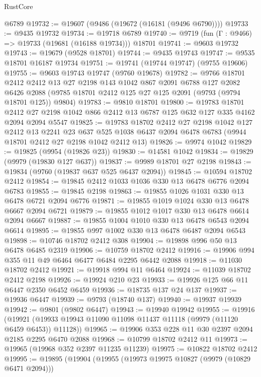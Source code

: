 \begin{lexlean}{RustCore}
\begin{coremodule}
    @6789
@19732 := @19607 (@9486 (@19672 (@16181 (@9496 @6790))))
@19733 := @9435 @19732
@19734 := @19718 @6789
@19740 := @9719 (fun (Γ : @9466) => @19733 (@19681 (@16188 @19734))) @18701
@19741 := @9603 @19732
@19743 := @19679 (@9528 @18701)
@19744 := @9435 @19743
@19747 := @9535 @18701 @16187 @19734
@19751 := @19741 (@19744 @19747) (@9755 @19606)
@19755 := @9603 @19743 @19747 (@9760 @19678)
@19782 := @9766
    @18701
    @2412
    @2412
    @13
    @27
    @2198
    @143
    @1042
    @867
    @2091
    @6788
    @127
    @2082
    @6426
    @2088
    (@9785 @18701 @2412 @125 @27 @125 @2091 (@9793 (@9794 @18701 @125)) @9804)
@19783 := @9810 @18701
@19800 := @19783
    @18701
    @2412
    @27
    @2198
    @1042
    @866
    @2412
    @13
    @6787
    @125
    @632
    @127
    @335
    @4162
    @2094
    @2094
    @5547
@19825 := @19783
    @18702
    @2412
    @27
    @2198
    @1042
    @127
    @2412
    @13
    @2241
    @23
    @637
    @525
    @1038
    @6437
    @2094
    @6478
    @6783
    (@9944 @18701 @2412 @27 @2198 @1042 @2412 @13)
@19826 := @9974 @1042
@19829 := @19825 (@9954 (@19826 @23))
@19830 := @14581 @1042
@19834 := @19829 (@9979 (@19830 @127 @637))
@19837 := @9989 @18701 @27 @2198
@19843 := @19834 (@9760 (@19837 @637 @525 @6437 @2094))
@19845 := @10594 @18702 @2412
@19854 := @19845 @2412 @1033 @1036 @330 @13 @6478 @6776 @2094 @6783
@19855 := @19845 @2198
@19863 := @19855 @1026 @1031 @330 @13 @6478 @6721 @2094 @6776
@19871 := @19855 @1019 @1024 @330 @13 @6478 @6667 @2094 @6721
@19879 := @19855 @1012 @1017 @330 @13 @6478 @6614 @2094 @6667
@19887 := @19855 @1004 @1010 @330 @13 @6478 @6543 @2094 @6614
@19895 := @19855 @997 @1002 @330 @13 @6478 @6487 @2094 @6543
@19898 := @10746 @18702 @2412 @308
@19904 := @19898 @996 @50 @13 @6478 @6485 @2319
@19906 := @10759 @18702 @2412
@19916 := @19906 @994 @355 @11 @49 @6464 @6477 @6484 @2295 @6442 @2088
@19918 := @11030 @18702 @2412
@19921 := @19918 @994 @11 @6464
@19924 := @11039 @18702 @2412 @2198
@19926 := @19924 @210 @23
@19933 := @19926 @125 @66 @11 @6447 @2350 @6452 @6459
@19936 := @18735 @137 @24 @137
@19937 := @19936 @6447
@19939 := @9793 (@18740 @137)
@19940 := @19937 @19939
@19942 := @9801 (@9802 @6447)
@19943 := @19940 @19942
@19955 := @19916
    (@19921 (@19933 @19943 @11090 @11098 @11437 @11118 (@9979 (@11120 @6459 @6453)) @11128))
@19965 := @19906 @353 @228 @11 @30 @2397 @2094 @2185 @2295 @6470 @2088
@19968 := @10799 @18702 @2412 @11
@19973 := @19965 (@19968 @352 @2397 @11235 @11239)
@19975 := @10822 @18702 @2412
@19995 := @19895
    (@19904
      (@19955
        (@19973 @19975 @10827 (@9979 (@10829 @6471 @2094)))

\end{coremodule}
\end{lexlean}
